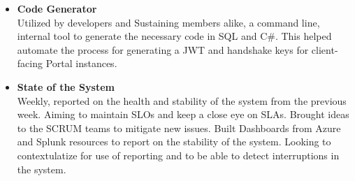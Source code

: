\documentclass[a4paper]{mctemplate} %
\begin{document}
\begin{main}
\begin{itemize}
    \item \textbf{Code Generator}
    \hfill \\
    \newline
    Utilized by developers and Sustaining members alike, a command line, internal tool to generate the necessary code in SQL and C\#. This helped automate the process for generating a JWT and handshake keys for client-facing Portal instances.
     
    
    \item \textbf{State of the System}
    \hfill \\
    \newline
    Weekly, reported on the health and stability of the system from the previous week. Aiming to maintain SLOs and keep a close eye on SLAs. Brought ideas to the SCRUM teams to mitigate new issues. Built Dashboards from Azure and Splunk resources to report on the stability of the system. Looking to contextulatize for use of reporting and to be able to detect interruptions in the system.
    


\end{itemize}
\end{main}
\end{document}
